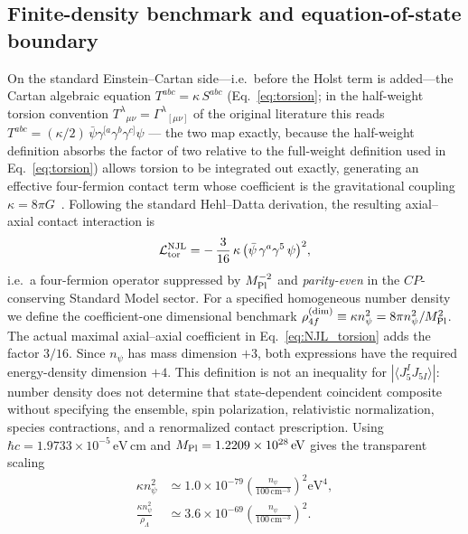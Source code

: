 \documentclass[aps,prd,twocolumn,superscriptaddress,preprintnumbers,nofootinbib,longbibliography,floatfix]{revtex4-2}
\begin{document}
\subsection{Finite-density benchmark and equation-of-state boundary}
\label{sec:r1_njl}
On the standard Einstein--Cartan side---i.e.\ before the Holst term is
added---the Cartan algebraic equation $T^{abc} = \kappa\,S^{abc}$
(Eq.~\eqref{eq:torsion}; in the half-weight torsion convention
$T^\lambda{}_{\mu\nu} = \Gamma^\lambda{}_{[\mu\nu]}$ of the original
literature this reads $T^{abc} = (\kappa/2)\,
\bar\psi \gamma^{[a}\gamma^b\gamma^{c]} \psi$ --- the two map exactly,
because the half-weight definition absorbs the factor of two relative to the
full-weight definition used in Eq.~\eqref{eq:torsion}) allows torsion to
be integrated out exactly, generating an effective four-fermion
contact term whose coefficient is the gravitational coupling
$\kappa = 8\pi G$~\cite{Hehl1976,HehlDattaNJL1971}. Following the standard
Hehl--Datta derivation, the resulting axial--axial contact interaction is
\begin{equation}
\mathcal{L}^{\rm NJL}_{\rm tor}
= -\,\frac{3}{16}\,\kappa\,\bigl(\bar\psi\,\gamma^a\gamma^5\,\psi\bigr)^2,
\label{eq:NJL_torsion}
\end{equation}
i.e.\ a four-fermion operator suppressed by $M_{\rm Pl}^{-2}$ and
\emph{parity-even} in the $C\!P$-conserving Standard Model sector. For a
specified homogeneous number density we define the coefficient-one
dimensional benchmark
$\rho_{4f}^{(\mathrm{dim})}\equiv\kappa n_\psi^2
=8\pi n_\psi^2/M_{\rm Pl}^2$.
The actual maximal axial--axial coefficient in Eq.~\eqref{eq:NJL_torsion}
adds the factor $3/16$.  Since $n_\psi$ has mass dimension $+3$, both
expressions have the required energy-density dimension $+4$.
This definition is not an inequality for
$|\langle J_5^I J_{5I}\rangle|$: number density does not determine that
state-dependent coincident composite without specifying the ensemble, spin
polarization, relativistic normalization, species contractions, and a
renormalized contact prescription.
Using $\hbar c=1.9733\times10^{-5}\,\text{eV}\,\text{cm}$ and
$M_{\rm Pl}=1.2209\times10^{28}\,\text{eV}$ gives the transparent scaling
\begin{align}
\kappa n_\psi^2 &\simeq 1.0\times10^{-79}
\left(\frac{n_\psi}{100\,\mathrm{cm}^{-3}}\right)^2\!\mathrm{eV}^4,
\nonumber\\
\frac{\kappa n_\psi^2}{\rho_\Lambda}&\simeq3.6\times10^{-69}
\left(\frac{n_\psi}{100\,\mathrm{cm}^{-3}}\right)^2.
\end{align}
\end{document}

